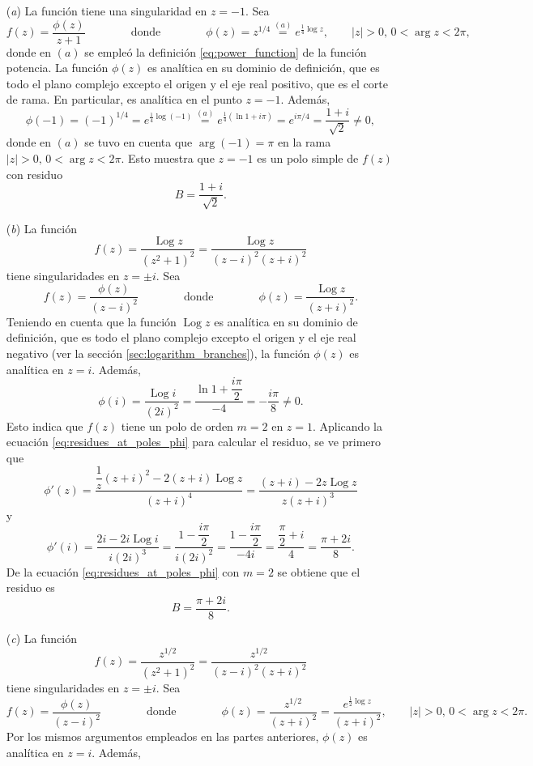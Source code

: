 \documentclass[a4paper]{report}
\DeclareMathOperator{\Log}{Log}
\begin{document}
\begin{enumerate}
 \item[(\textit{a})] La función tiene una singularidad en \(z=-1\). Sea 
 \[
  f(z)=\frac{\phi(z)}{z+1}
  \qquad\qquad\textrm{donde}\qquad\qquad
  \phi(z)=z^{1/4}\overset{(a)}{=}e^{\frac{1}{4}\log z},\qquad
 |z|>0,\,0<\arg z<2\pi,
 \]
 donde en \((a)\) se empleó la definición \ref{eq:power_function} de la función potencia. La función \(\phi(z)\) es analítica en su dominio de definición, que es todo el plano complejo excepto el origen y el eje real positivo, que es el corte de rama. En particular, es analítica en el punto \(z=-1\). Además,
 \[
  \phi(-1)=(-1)^{1/4}=e^{\frac{1}{4}\log(-1)}\overset{(a)}{=}e^{\frac{1}{4}(\ln1+i\pi)}=e^{i\pi/4}=\frac{1+i}{\sqrt{2}}\neq0,
 \]
 donde en \((a)\) se tuvo en cuenta que \(\arg(-1)=\pi\) en la rama \(|z|>0,\,0<\arg z<2\pi\). Esto muestra que \(z=-1\) es un polo simple de \(f(z)\) con residuo 
 \[
  B=\frac{1+i}{\sqrt{2}}.
 \]
 \item[(\textit{b})] La función 
 \[
  f(z)=\frac{\Log z}{(z^2+1)^2}=\frac{\Log z}{(z-i)^2(z+i)^2}
 \]
 tiene singularidades en \(z=\pm i\). Sea 
 \[
  f(z)=\frac{\phi(z)}{(z-i)^2}
  \qquad\qquad\textrm{donde}\qquad\qquad
  \phi(z)=\frac{\Log z}{(z+i)^2}.
 \]
 Teniendo en cuenta que la función \(\Log z\) es analítica en su dominio de definición, que es todo el plano complejo excepto el origen y el eje real negativo (ver la sección \ref{sec:logarithm_branches}), la función \(\phi(z)\) es analítica en \(z=i\). Además,
 \[
  \phi(i)=\frac{\Log i}{(2i)^2}=\frac{\ln1+\dfrac{i\pi}{2}}{-4}=-\frac{i\pi}{8}\neq0.
 \]
 Esto indica que \(f(z)\) tiene un polo de orden \(m=2\) en \(z=1\). Aplicando la ecuación \ref{eq:residues_at_poles_phi} para calcular el residuo, se ve primero que 
 \[
  \phi'(z)=\frac{\dfrac{1}{z}(z+i)^2-2(z+i)\Log z}{(z+i)^4}=\frac{(z+i)-2z\Log z}{z(z+i)^3}
 \]
 y
 \[
  \phi'(i)=\frac{2i-2i\Log i}{i(2i)^3}=\frac{1-\dfrac{i\pi}{2}}{i(2i)^2}=\frac{1-\dfrac{i\pi}{2}}{-4i}
   =\frac{\dfrac{\pi}{2}+i}{4}=\frac{\pi+2i}{8}.
 \]
 De la ecuación \ref{eq:residues_at_poles_phi} con \(m=2\) se obtiene que el residuo es
 \[
  B=\frac{\pi+2i}{8}.
 \]
 \item[(\textit{c})] La función 
 \[
  f(z)=\frac{z^{1/2}}{(z^2+1)^2}=\frac{z^{1/2}}{(z-i)^2(z+i)^2}
 \]
 tiene singularidades en \(z=\pm i\). Sea 
 \[
  f(z)=\frac{\phi(z)}{(z-i)^2}
  \qquad\qquad\textrm{donde}\qquad\qquad
  \phi(z)=\frac{z^{1/2}}{(z+i)^2}=\frac{e^{\frac{1}{2}\log z}}{(z+i)^2},\qquad
  |z|>0,\,0<\arg z<2\pi.
 \]
 Por los mismos argumentos empleados en las partes anteriores, \(\phi(z)\) es analítica en \(z=i\). Además,

\end{enumerate}
\end{document}
